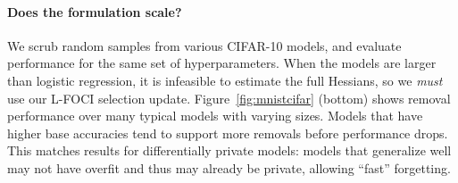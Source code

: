

\paragraph{Does the formulation scale?} We scrub random samples from various CIFAR-10 models, and evaluate  performance for the same set of hyperparameters. When the models are larger than logistic regression, it is infeasible to estimate the full Hessians, so 
we {\em must} use our L-FOCI selection update. Figure~\ref{fig:mnistcifar} (bottom) shows removal performance over many typical models with varying sizes. Models that have higher base accuracies tend to support more removals before performance drops. This matches results for differentially private models: models that generalize well may not have overfit and thus may already be private, allowing ``fast'' forgetting.


